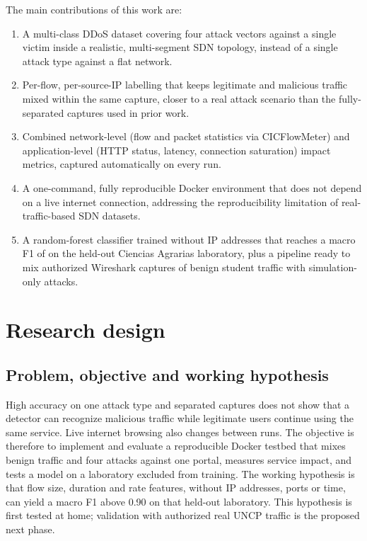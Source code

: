 \documentclass[a4paper,fleqn]{cas-dc}
\begin{document}
The main contributions of this work are:
\begin{enumerate}[label=\roman*.]
  \item A multi-class DDoS dataset covering four attack vectors
        against a single victim inside a realistic, multi-segment SDN
        topology, instead of a single attack type against a flat
        network.
  \item Per-flow, per-source-IP labelling that keeps legitimate and
        malicious traffic mixed within the same capture, closer to a
        real attack scenario than the fully-separated captures used
        in prior work.
  \item Combined network-level (flow and packet statistics via
        CICFlowMeter) and application-level (HTTP status, latency,
        connection saturation) impact metrics, captured automatically
        on every run.
  \item A one-command, fully reproducible Docker environment that
        does not depend on a live internet connection, addressing the
        reproducibility limitation of real-traffic-based SDN
        datasets.
  \item A random-forest classifier trained without IP addresses that
        reaches a macro F1 of \Fmacro on the held-out Ciencias
        Agrarias laboratory, plus a pipeline ready to mix authorized
        Wireshark captures of benign student traffic with
        simulation-only attacks.
\end{enumerate}

\section{Research design}\label{sec:research}

\subsection{Problem, objective and working hypothesis}
High accuracy on one attack type and separated captures does not show
that a detector can recognize malicious traffic while legitimate
users continue using the same service. Live internet browsing also
changes between runs. The objective is therefore to implement and
evaluate a reproducible Docker testbed that mixes benign traffic and
four attacks against one portal, measures service impact, and tests a
model on a laboratory excluded from training. The working hypothesis
is that flow size, duration and rate features, without IP addresses,
ports or time, can yield a macro F1 above 0.90 on that held-out
laboratory. This hypothesis is first tested at home; validation with
authorized real UNCP traffic is the proposed next phase.
\end{document}
